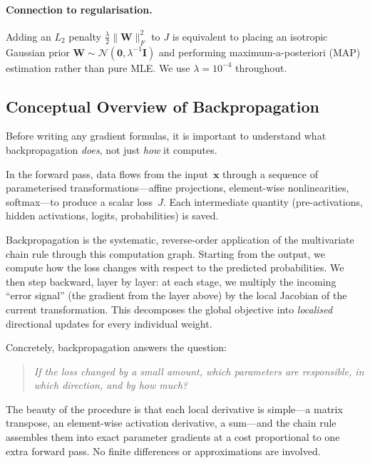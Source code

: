 \documentclass[11pt]{article}
\newcommand{\bx}{\mathbf{x}}
\newcommand{\bW}{\mathbf{W}}
\begin{document}
\paragraph{Connection to regularisation.}
Adding an $L_2$ penalty $\frac{\lambda}{2}\|\bW\|_F^2$ to $J$ is equivalent to placing an
isotropic Gaussian prior $\bW\sim\mathcal{N}(\mathbf{0},\lambda^{-1}\mathbf{I})$ and performing
maximum-a-posteriori (MAP) estimation rather than pure MLE.  We use $\lambda=10^{-4}$ throughout.

\subsection{Conceptual Overview of Backpropagation}
\label{sec:backprop-concept}

Before writing any gradient formulas, it is important to understand what backpropagation
\emph{does}, not just \emph{how} it computes.

In the forward pass, data flows from the input~$\bx$ through a sequence of parameterised
transformations---affine projections, element-wise nonlinearities, softmax---to produce a scalar
loss~$J$.  Each intermediate quantity (pre-activations, hidden activations, logits, probabilities)
is saved.

Backpropagation is the systematic, reverse-order application of the multivariate chain rule
through this computation graph.  Starting from the output, we compute how the loss changes with
respect to the predicted probabilities.  We then step backward, layer by layer: at each stage, we
multiply the incoming ``error signal'' (the gradient from the layer above) by the local Jacobian
of the current transformation.  This decomposes the global objective into \emph{localised}
directional updates for every individual weight.

Concretely, backpropagation answers the question:
\begin{quote}
\itshape If the loss changed by a small amount, which parameters are responsible, in which
direction, and by how much?
\end{quote}

The beauty of the procedure is that each local derivative is simple---a matrix transpose, an
element-wise activation derivative, a sum---and the chain rule assembles them into exact
parameter gradients at a cost proportional to one extra forward pass.  No finite differences or
approximations are involved.
\end{document}
